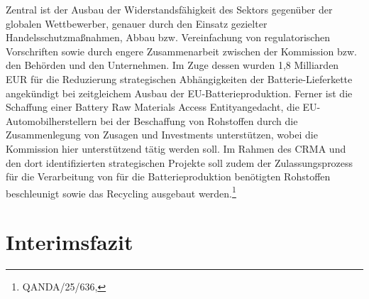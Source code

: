 \documentclass[12pt,a4paper,oneside]{book} %
\begin{document}
	Zentral ist der Ausbau der Widerstandsfähigkeit des Sektors gegenüber der globalen Wettbewerber, genauer durch den Einsatz gezielter Handelsschutzmaßnahmen, Abbau bzw. Vereinfachung von regulatorischen Vorschriften sowie durch engere Zusammenarbeit zwischen der Kommission bzw. den Behörden und den Unternehmen. Im Zuge dessen wurden 1,8 Milliarden EUR für die Reduzierung strategischen Abhängigkeiten der Batterie-Lieferkette angekündigt bei zeitgleichem Ausbau der EU-Batterieproduktion. Ferner ist die Schaffung einer \glqq Battery Raw Materials Access Entity\grqq angedacht, die EU-Automobilherstellern bei der Beschaffung von Rohstoffen durch die Zusammenlegung von Zusagen und Investments unterstützen, wobei die Kommission hier unterstützend tätig werden soll. Im Rahmen des CRMA und den dort identifizierten strategischen Projekte soll zudem der Zulassungsprozess für die Verarbeitung von für die Batterieproduktion benötigten Rohstoffen beschleunigt sowie das Recycling ausgebaut werden.\footnote{QANDA/25/636, }
	
	
	
	\section{Interimsfazit}
\end{document}
